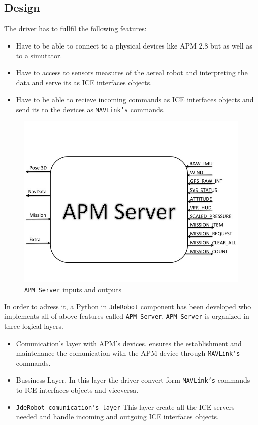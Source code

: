 \documentclass{llncs}
\begin{document}
\subsection{Design}
\label{sec:design}

The driver has to fullfil the following features:

\begin{itemize}
\item Have to be able to connect to a physical devices like APM 2.8 but as well as to a simutator.
\item Have to access to sensors measures of the aereal robot and interpreting the data and serve its as ICE interfaces objects.
\item Have to be able to recieve incoming commands as ICE interfaces objects and send its to the devices as \texttt{MAVLink's} commands.
\end{itemize}

\begin{figure}[h]
  \centering
  \includegraphics[scale=0.5]{img/diseno.jpg}
  \caption{\texttt{APM Server} inputs and outputs}
  \label{fig:diseno_apms_caja_negra}
\end{figure}

In order to adress it, a Python in \texttt{JdeRobot} component has been developed who implements all of above features called \texttt{APM Server}. 
\texttt{APM Server} is organized in three logical layers.
\begin{itemize}
\item Comunication's layer with APM's devices. ensures the establishment and maintenance the comunication with the APM device through \texttt{MAVLink's} commands.
\item Bussiness Layer. In this layer the driver convert form \texttt{MAVLink's} commands to ICE interfaces objects and viceversa.
\item \texttt{JdeRobot comunication's layer} This layer create all the ICE servers needed and handle incoming and outgoing ICE interfaces objects.
\end{itemize}
\end{document}
